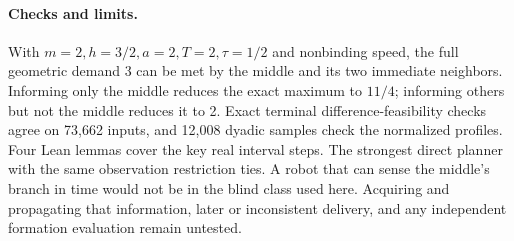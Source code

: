 \documentclass[11pt]{article}
\begin{document}
\paragraph{Checks and limits.}
With \(m=2,h=3/2,a=2,T=2,\tau=1/2\) and nonbinding speed,
the full geometric demand 3 can be met by the middle
and its two immediate neighbors. Informing only the
middle reduces the exact maximum to \(11/4\); informing
others but not the middle reduces it to 2. Exact terminal
difference-feasibility checks agree on 73,662 inputs, and
12,008 dyadic samples check the normalized profiles.
Four Lean lemmas cover the key real interval steps.
The strongest direct planner with the same observation
restriction ties. A robot that can sense the middle's
branch in time would not be in the blind class used here.
Acquiring and propagating that information, later or
inconsistent delivery, and any independent formation
evaluation remain untested.
\end{document}
